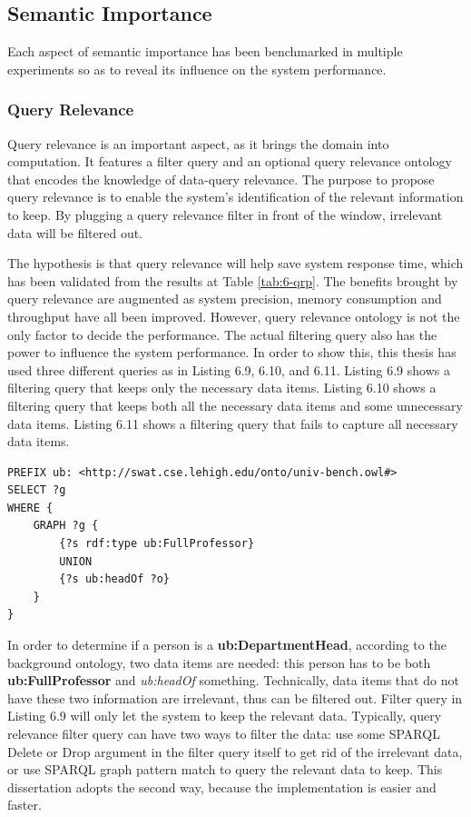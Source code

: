 \subsection{Semantic Importance}
Each aspect of semantic importance has been benchmarked in multiple experiments so as to reveal its influence on the system performance. 
%
\subsubsection{Query Relevance}
Query relevance is an important aspect, as it brings the domain into computation.
It features a filter query and an optional query relevance ontology that encodes the knowledge of data-query relevance.
The purpose to propose query relevance is to enable the system's identification of the relevant information to keep. 
By plugging a query relevance filter in front of the window, irrelevant data will be filtered out.

The hypothesis is that query relevance will help save system response time, which has been validated from the results at Table \ref{tab:6-qrp}. 
The benefits brought by query relevance are augmented as system precision, memory consumption and throughput have all been improved. 
However, query relevance ontology is not the only factor to decide the performance. 
The actual filtering query also has the power to influence the system performance. 
In order to show this, this thesis has used three different queries as in Listing 6.9, 6.10, and 6.11.
Listing 6.9 shows a filtering query that keeps only the necessary data items.
Listing 6.10 shows a filtering query that keeps both all the necessary data items and some unnecessary data items.
Listing 6.11 shows a filtering query that fails to capture all necessary data items.

\begin{lstlisting}[language=SPARQL,caption={Query Relevance Filtering Query 1},basicstyle=\small,frame=single]
PREFIX ub: <http://swat.cse.lehigh.edu/onto/univ-bench.owl#>
SELECT ?g
WHERE {
    GRAPH ?g {
        {?s rdf:type ub:FullProfessor}
        UNION
    	{?s ub:headOf ?o}  
    }
}
\end{lstlisting}

In order to determine if a person is a \textbf{ub:DepartmentHead}, according to the background ontology, two data items are needed: this person has to be both \textbf{ub:FullProfessor} and \textit{ub:headOf} something.
Technically, data items that do not have these two information are irrelevant, thus can be filtered out. 
Filter query in Listing 6.9 will only let the system to keep the relevant data.
Typically, query relevance filter query can have two ways to filter the data: use some SPARQL Delete or Drop argument in the filter query itself to get rid of the irrelevant data, or use SPARQL graph pattern match to query the relevant data to keep. 
This dissertation adopts the second way, because the implementation is easier and faster.

